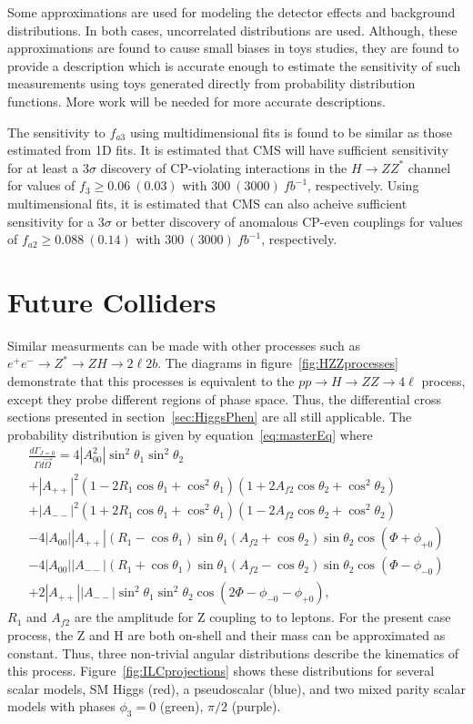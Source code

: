 Some approximations are used for modeling the detector
effects and background distributions.  In both cases,
uncorrelated distributions are used.  Although, these
approximations are found to cause 
small biases in toys studies, they are found to provide 
a description which is accurate enough to estimate the
sensitivity of such measurements using toys generated
directly from probability distribution functions.
More work will be needed for more accurate descriptions.  

The sensitivity to $f_{a3}$ using multidimensional fits
is found to be similar as those estimated from 1D fits.  
It is estimated that CMS will have sufficient sensitivity for
at least a $3\sigma$ discovery of CP-violating interactions in 
the $H\to ZZ^*$ channel for values of $f_{3}\geq0.06~(0.03)$
 with $300~(3000)~fb^{-1}$, respectively.
Using multimensional fits, it is estimated that CMS can also
acheive sufficient sensitivity 
for a $3\sigma$ or better discovery of anomalous CP-even 
couplings for values of $f_{a2}\geq0.088~(0.14)$ with 
$300~(3000)~fb^{-1}$, respectively.

\section{Future Colliders}

Similar measurments can be made with other processes such as
$e^+e^-\to Z^*\to ZH \to 2\ell2b$.  The diagrams in 
figure~\ref{fig:HZZprocesses} demonstrate that 
this processes is equivalent to the $pp\to H\to ZZ\to4\ell$
process, except they probe different regions of phase space.
Thus, the differential cross sections
presented in section~\ref{sec:HiggsPhen} are all still applicable.
The probability distribution is given by equation~\ref{eq:masterEq}
where
\begin{equation}
\begin{split}
\frac{d\Gamma_{J=0}}{\Gamma d\vec{\Omega}} = 4|A_{00}^2|\sin^2\theta_1\sin^2\theta_2 \\
+|A_{++}|^2(1-2R_1\cos\theta_1+\cos^2\theta_1)(1+2A_{f2}\cos\theta_2+\cos^2\theta_2)\\
+|A_{--}|^2(1+2R_1\cos\theta_1+\cos^2\theta_1)(1-2A_{f2}\cos\theta_2+\cos^2\theta_2) \\
-4|A_{00}||A_{++}|(R_1-\cos\theta_1)\sin\theta_1(A_{f2}+\cos\theta_2)\sin\theta_2\cos(\Phi+\phi_{+0}) \\
-4|A_{00}||A_{--}|(R_1+\cos\theta_1)\sin\theta_1(A_{f2}-\cos\theta_2)\sin\theta_2\cos(\Phi-\phi_{-0}) \\
+2|A_{++}||A_{--}|\sin^2\theta_1\sin^2\theta_2\cos(2\Phi-\phi_{-0}-\phi_{+0}),
\end{split}
\end{equation}
$R_1$ and $A_{f2}$ are the amplitude for Z coupling to to 
leptons.
For the present case process, the Z and H are both on-shell 
and their mass can be approximated as constant. 
Thus, three non-trivial angular distributions describe 
the kinematics of this process. Figure~\ref{fig:ILCprojections}
shows these distributions for several scalar models, SM Higgs
(red), a pseudoscalar (blue), and two mixed parity scalar models
with phases $\phi_3=0$ (green), $\pi/2$ (purple).  

